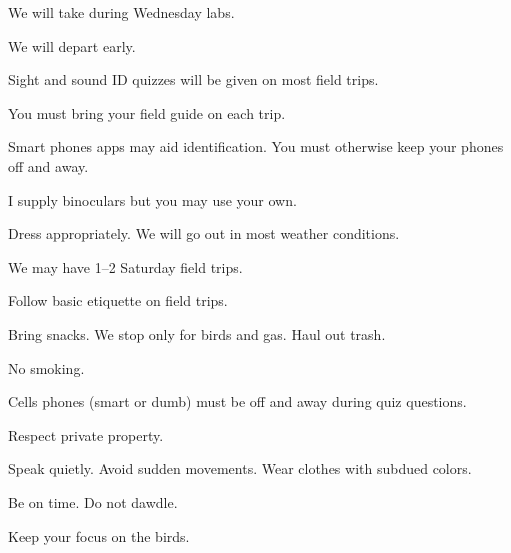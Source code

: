 \documentclass[t]{beamer}
\begin{document}
%
%
%
%
%	
%	
%	
%	


\begin{frame}[t,plain]{We will take  during Wednesday labs.}

	\hangpara We will depart early. 
	
	\hangpara Sight and sound ID quizzes will be given on most field trips.
	
	\hangpara You must bring your field guide on each trip.

	\hangpara Smart phones apps may aid identification. You must otherwise keep your phones off and away.

	\hangpara I supply binoculars but you may use your own. 

	\hangpara Dress appropriately.  We will go out in most weather conditions.
		
	\hangpara We may have 1–2 Saturday field trips.
	
\end{frame}

\begin{frame}[t,plain]{Follow basic etiquette on field trips.}

	\hangpara Bring snacks. We stop only for birds and gas. Haul out  trash.
	
	\hangpara No smoking.
	

	\hangpara Cells phones (smart or dumb) must be off and away during quiz questions.

	\hangpara Respect private property.
	
	\hangpara Speak quietly. Avoid sudden movements. Wear clothes with subdued colors.
	
	\hangpara Be on time. Do not dawdle.
	
	\hangpara Keep your focus on the birds.
	
\end{frame}
\end{document}
